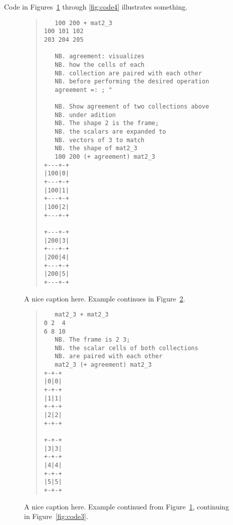 \noindent
Code in Figures~\ref{fig:code1} through \ref{fig:code4}
illustrates something.
% 
%
\begin{figure}[p]
\begin{quote}
\begin{singlespacing}
\begin{small}
\begin{verbatim}
   100 200 + mat2_3
100 101 102
203 204 205

   NB. agreement: visualizes
   NB. how the cells of each 
   NB. collection are paired with each other
   NB. before performing the desired operation
   agreement =: ; "

   NB. Show agreement of two collections above
   NB. under adition
   NB. The shape 2 is the frame;
   NB. the scalars are expanded to
   NB. vectors of 3 to match 
   NB. the shape of mat2_3
   100 200 (+ agreement) mat2_3
+---+-+
|100|0|
+---+-+
|100|1|
+---+-+
|100|2|
+---+-+

+---+-+
|200|3|
+---+-+
|200|4|
+---+-+
|200|5|
+---+-+
\end{verbatim}
\end{small}
\end{singlespacing}
\end{quote}
\caption{A nice caption here.  
Example continues in Figure~\ref{fig:code2}.}
\label{fig:code1}
\end{figure}
%
\begin{figure}[p]
\begin{quote}
\begin{singlespacing}
\begin{small}
\begin{verbatim}
   mat2_3 + mat2_3
0 2  4
6 8 10
   NB. The frame is 2 3;
   NB. the scalar cells of both collections
   NB. are paired with each other
   mat2_3 (+ agreement) mat2_3
+-+-+
|0|0|
+-+-+
|1|1|
+-+-+
|2|2|
+-+-+

+-+-+
|3|3|
+-+-+
|4|4|
+-+-+
|5|5|
+-+-+
\end{verbatim}
\end{small}
\end{singlespacing}
\end{quote}
\caption{A nice caption here.  
Example continued from Figure~\ref{fig:code1},
continuing in Figure~\ref{fig:code3}.}
\label{fig:code2}
\end{figure}
